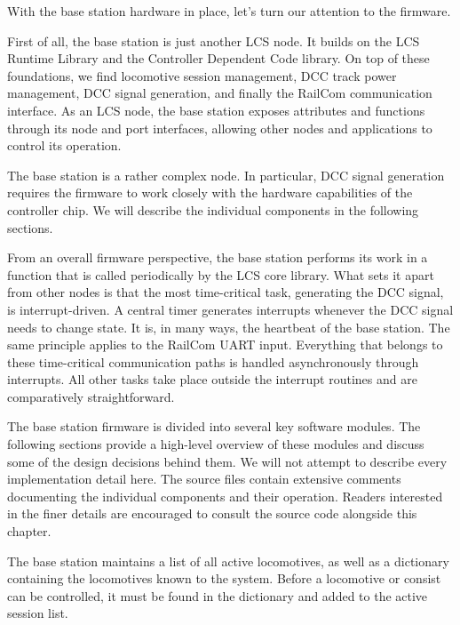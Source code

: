 
With the base station hardware in place, let’s turn our attention to the firmware.

First of all, the base station is just another LCS node. It builds on the LCS Runtime Library and the Controller Dependent Code library. On top of these foundations, we find locomotive session management, DCC track power management, DCC signal generation, and finally the RailCom communication interface. As an LCS node, the base station exposes attributes and functions through its node and port interfaces, allowing other nodes and applications to control its operation.

The base station is a rather complex node. In particular, DCC signal generation requires the firmware to work closely with the hardware capabilities of the controller chip. We will describe the individual components in the following sections.

From an overall firmware perspective, the base station performs its work in a function that is called periodically by the LCS core library. What sets it apart from other nodes is that the most time-critical task, generating the DCC signal, is interrupt-driven. A central timer generates interrupts whenever the DCC signal needs to change state. It is, in many ways, the heartbeat of the base station. The same principle applies to the RailCom UART input. Everything that belongs to these time-critical communication paths is handled asynchronously through interrupts. All other tasks take place outside the interrupt routines and are comparatively straightforward.

The base station firmware is divided into several key software modules. The following sections provide a high-level overview of these modules and discuss some of the design decisions behind them. We will not attempt to describe every implementation detail here. The source files contain extensive comments documenting the individual components and their operation. Readers interested in the finer details are encouraged to consult the source code alongside this chapter.


The base station maintains a list of all active locomotives, as well as a dictionary containing the locomotives known to the system. Before a locomotive or consist can be controlled, it must be found in the dictionary and added to the active session list.

